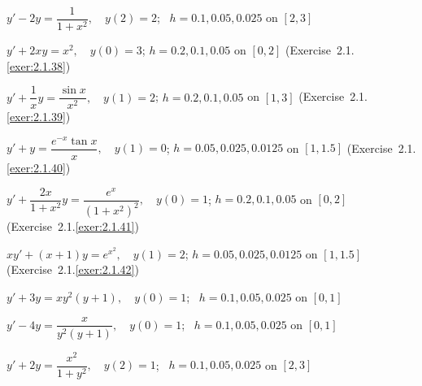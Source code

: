 \begin{exerciselist}

\item\label{exer:3.3.14}\Cex
$y'-2y=\dfrac{1}{1+x^2},\quad y(2)=2$;  \,
$h=0.1,0.05,0.025$ on $[2,3]$

\item\label{exer:3.3.15}\Cex
$y'+2xy=x^2,\quad y(0)=3$;\quad
$h=0.2,0.1,0.05$ on $[0,2]$
({Exercise~2.1.\ref{exer:2.1.38}})

\item\label{exer:3.3.16}\Cex
$y'+\dfrac{1}{x}y=\dfrac{\sin x}{x^2},\quad y(1)=2$;\quad
$h=0.2,0.1,0.05$ on $[1,3]$
({Exercise~2.1.\ref{exer:2.1.39}})

\item\label{exer:3.3.17}\Cex
$y'+y=\dfrac{e^{-x}\tan x}{x},\quad y(1)=0$;\quad
$h=0.05,0.025,0.0125$ on $[1,1.5]$
({Exercise~2.1.\ref{exer:2.1.40}})

\item\label{exer:3.3.18}\Cex
$y'+\dfrac{2x}{1+x^2}y=\dfrac{e^x}{(1+x^2)^2}, \quad y(0)=1$; \quad
$h=0.2,0.1,0.05$ on $[0,2]$
 ({Exercise~2.1.\ref{exer:2.1.41}})

\item\label{exer:3.3.19}\Cex
$xy'+(x+1)y=e^{x^2},\quad y(1)=2$;\quad
$h=0.05,0.025,0.0125$ on $[1,1.5]$
({Exercise~2.1.\ref{exer:2.1.42}})


\item\label{exer:3.3.20}\Cex
$y'+3y=xy^2(y+1),\quad y(0)=1$;  \,
$h=0.1,0.05,0.025$ on $[0,1]$


\item\label{exer:3.3.21}\Cex
$y'-4y=\dfrac{x}{y^2(y+1)},\quad y(0)=1$;  \,
 $h=0.1,0.05,0.025$ on $[0,1]$

\item\label{exer:3.3.22}\Cex
$y'+2y=\dfrac{x^2}{1+y^2},\quad y(2)=1$;  \,
 $h=0.1,0.05,0.025$ on $[2,3]$


\end{exerciselist}
